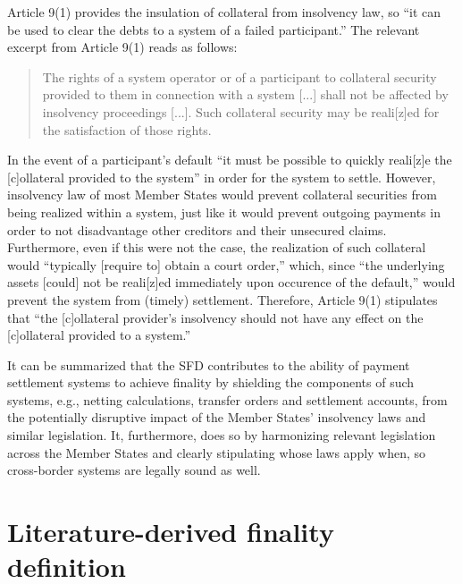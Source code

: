 Article 9(1) provides the insulation of collateral from insolvency law, so ``it can be used to clear the debts to a system of a failed participant.'' \autocite[19]{cpmi2001}
The relevant excerpt from Article 9(1) reads as follows: \autocite{eu1998sfd}

\begin{quote}
	The rights of a system operator or of a participant to collateral security provided to them in connection with a system [...] shall not be affected by insolvency proceedings [...].
	Such collateral security may be reali[z]ed for the satisfaction of those rights.
\end{quote}

In the event of a participant's default ``it must be possible to quickly reali[z]e the [c]ollateral provided to the system'' in order for the system to settle. \autocite[60]{vereecken2003}
However, insolvency law of most Member States would prevent collateral securities from being realized within a system, just like it would prevent outgoing payments in order to not disadvantage other creditors and their unsecured claims.
Furthermore, even if this were not the case, the realization of such collateral would ``typically [require to] obtain a court order,'' which, since ``the underlying assets [could] not be reali[z]ed immediately upon occurence of the default,'' would prevent the system from (timely) settlement. \autocite[60, 61]{vereecken2003}
Therefore, Article 9(1) stipulates that ``the [c]ollateral provider's insolvency should not have any effect on the [c]ollateral provided to a system.'' \autocite[61]{vereecken2003}

It can be summarized that the SFD contributes to the ability of payment settlement systems to achieve finality by shielding the components of such systems, e.g., netting calculations, transfer orders and settlement accounts, from the potentially disruptive impact of the Member States' insolvency laws and similar legislation.
It, furthermore, does so by harmonizing relevant legislation across the Member States and clearly stipulating whose laws apply when, so cross-border systems are legally sound as well.

\section{Literature-derived finality definition}

